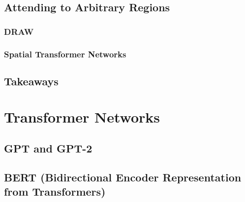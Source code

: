 		\subsection{Attending to Arbitrary Regions} %

			\subsubsection{DRAW} %

			\subsubsection{Spatial Transformer Networks} %

		\subsection{Takeaways} %

	\section{Transformer Networks} %

		\subsection{GPT and GPT-2} %

		\subsection{BERT (Bidirectional Encoder Representation from Transformers)} %
